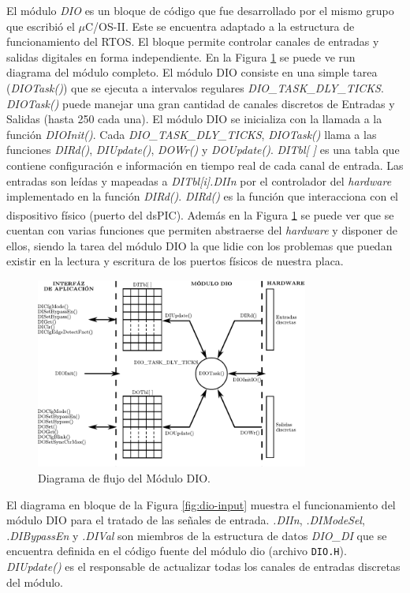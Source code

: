 \documentclass[11pt,a4paper,oneside]{article}
\def\uCOS{$\mu$C/OS-II\texttrademark}
\begin{document}
El módulo \emph{DIO} es un bloque de código que fue desarrollado por el mismo grupo que escribió el \uCOS. Este se encuentra adaptado a la estructura de funcionamiento del RTOS. El bloque permite controlar canales de entradas y salidas digitales en forma independiente. En la Figura \ref{fig:dio-diagrama} se puede ve run diagrama del módulo completo. El módulo DIO consiste en una simple tarea (\emph{DIOTask()}) que se ejecuta a intervalos regulares \emph{DIO\_TASK\_DLY\_TICKS}. \emph{DIOTask()} puede manejar una gran cantidad de canales discretos de Entradas y Salidas (hasta 250 cada una). El módulo DIO se inicializa con la llamada a la función \emph{DIOInit()}. Cada \emph{DIO\_TASK\_DLY\_TICKS}, \emph{DIOTask()} llama a las funciones \emph{DIRd()}, \emph{DIUpdate()}, \emph{DOWr()} y \emph{DOUpdate()}. \emph{DITbl[ ]} es una tabla que contiene configuración e  información en tiempo real de cada canal de entrada. Las entradas son leídas y mapeadas a \emph{DITbl[i].DIIn} por el controlador del \textsl{hardware} implementado en la función \emph{DIRd()}. \emph{DIRd()} es la función que interacciona con el dispositivo físico (puerto del dsPIC\textsuperscript{\textregistered}). Además en la Figura \ref{fig:dio-diagrama} se puede ver que se cuentan con varias funciones que permiten abstraerse del \textsl{hardware} y disponer de ellos, siendo la tarea del módulo DIO la que lidie con los problemas que puedan existir en la lectura y escritura de los puertos físicos de nuestra placa.

\begin{figure}[!ht]
  \centering
  \includegraphics[width=0.8\textwidth]{images/dio_modulo_func}
  \caption{Diagrama de flujo del Módulo DIO.}
  \label{fig:dio-diagrama}
\end{figure}

El diagrama en bloque de la Figura \ref{fig:dio-input} muestra el funcionamiento del módulo DIO para el tratado de las señales de entrada. \emph{.DIIn}, \emph{.DIModeSel}, \emph{.DIBypassEn} y \emph{.DIVal} son miembros de la estructura de datos \emph{DIO\_DI} que se encuentra definida en el código fuente del módulo dio (archivo \texttt{DIO.H}). \emph{DIUpdate()} es el responsable de actualizar todas los canales de entradas discretas del módulo.
\end{document}
